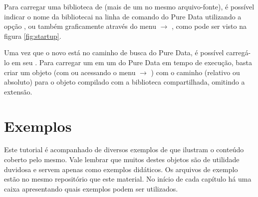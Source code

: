 
Para carregar uma biblioteca de \externals (mais de um \external no mesmo
arquivo-fonte), é possível indicar o nome da bibliotecai na linha
de comando do Pure Data utilizando a opção , ou
também graficamente através do menu  $\rightarrow$
, como pode ser visto na figura \ref{fig:startup}.


Uma vez que o novo \external está no caminho de busca do Pure Data, é possível
carregá-lo em seu \patch.
Para carregar um \external em um  do Pure Data em tempo de
execução, basta criar um objeto (com  ou acessando o menu
 $\rightarrow$ ) com o caminho (relativo ou
absoluto) para o objeto compilado com a biblioteca compartilhada, omitindo a
extensão.

\section{Exemplos}
Este tutorial é acompanhado de diversos exemplos de \externals que ilustram o
conteúdo coberto pelo mesmo.
Vale lembrar que muitos destes objetos são de utilidade duvidosa e servem apenas
como exemplos didáticos.
Os arquivos de exemplo estão no mesmo repositório que este material.
No início de cada capítulo há uma caixa apresentando quais exemplos podem ser
utilizados.
